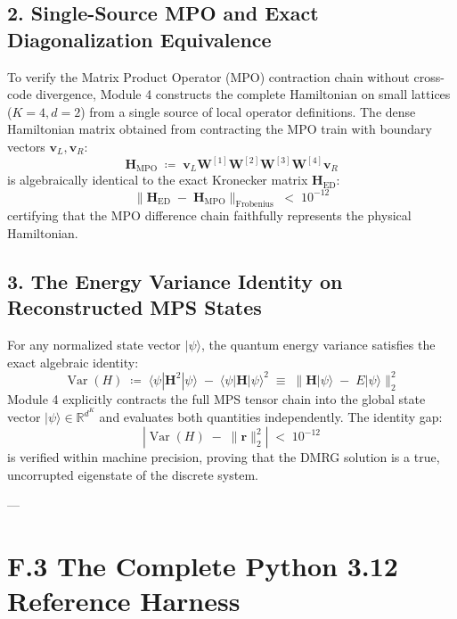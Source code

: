 \documentclass[
    12pt,
    a4paper,
    headings=normal,
    twoside=false,
    open=any,
    parskip=half
]{scrbook}
\begin{document}
\subsection{2. Single-Source MPO and Exact Diagonalization Equivalence}
To verify the Matrix Product Operator (MPO) contraction chain without cross-code divergence, Module 4 constructs the complete Hamiltonian on small lattices ($K=4, d=2$) from a single source of local operator definitions. The dense Hamiltonian matrix obtained from contracting the MPO train with boundary vectors $\mathbf{v}_L, \mathbf{v}_R$:
\begin{equation}
\mathbf{H}_{\text{MPO}} \;\coloneqq\; \mathbf{v}_L \mathbf{W}^{[1]} \mathbf{W}^{[2]} \mathbf{W}^{[3]} \mathbf{W}^{[4]} \mathbf{v}_R
\end{equation}
is algebraically identical to the exact Kronecker matrix $\mathbf{H}_{\text{ED}}$:
\begin{equation}
\|\mathbf{H}_{\text{ED}} \;-\; \mathbf{H}_{\text{MPO}}\|_{\text{Frobenius}} \;<\; 10^{-12}
\end{equation}
certifying that the MPO difference chain faithfully represents the physical Hamiltonian.

\subsection{3. The Energy Variance Identity on Reconstructed MPS States}
For any normalized state vector $|\psi\rangle$, the quantum energy variance satisfies the exact algebraic identity:
\begin{equation}
\operatorname{Var}(H) \;\coloneqq\; \langle \psi | \mathbf{H}^2 | \psi \rangle \;-\; \langle \psi | \mathbf{H} | \psi \rangle^2 \;\equiv\; \| \mathbf{H}|\psi\rangle \;-\; E|\psi\rangle \|_2^2
\label{eq:appF_variance_identity}
\end{equation}
Module 4 explicitly contracts the full MPS tensor chain into the global state vector $|\psi\rangle \in \mathbb{R}^{d^K}$ and evaluates both quantities independently. The identity gap:
\begin{equation}
\left| \operatorname{Var}(H) \;-\; \|\mathbf{r}\|_2^2 \right| \;<\; 10^{-12}
\end{equation}
is verified within machine precision, proving that the DMRG solution is a true, uncorrupted eigenstate of the discrete system.

---

\section{F.3 The Complete Python 3.12 Reference Harness}
\label{sec:appF_python_code}
\end{document}
